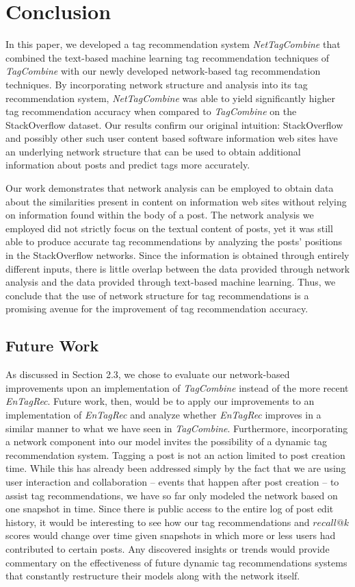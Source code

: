 \documentclass[10pt]{IEEEtran}
\begin{document}
\section{Conclusion}

In this paper, we developed a tag recommendation system \textit{NetTagCombine} that combined the text-based machine learning tag recommendation techniques of \textit{TagCombine} with our newly developed network-based tag recommendation techniques. By incorporating network structure and analysis into its tag recommendation system, \textit{NetTagCombine} was able to yield significantly higher tag recommendation accuracy when compared to \textit{TagCombine} on the StackOverflow dataset. Our results confirm our original intuition: StackOverflow and possibly other such user content based software information web sites have an underlying network structure that can be used to obtain additional information about posts and predict tags more accurately.

Our work demonstrates that network analysis can be employed to obtain data about the similarities present in content on information web sites without relying on information found within the body of a post. The network analysis we employed did not strictly focus on the textual content of posts, yet it was still able to produce accurate tag recommendations by analyzing the posts' positions in the StackOverflow networks. Since the information is obtained through entirely different inputs, there is little overlap between the data provided through network analysis and the data provided through text-based machine learning. Thus, we conclude that the use of network structure for tag recommendations is a promising avenue for the improvement of tag recommendation accuracy.

\subsection{Future Work}

As discussed in Section 2.3, we chose to evaluate our network-based improvements upon an implementation of \textit{TagCombine} instead of the more recent \textit{EnTagRec}. Future work, then, would be to apply our improvements to an implementation of \textit{EnTagRec} and analyze whether \textit{EnTagRec} improves in a similar manner to what we have seen in \textit{TagCombine}. Furthermore, incorporating a network component into our model invites the possibility of a dynamic tag recommendation system. Tagging a post is not an action limited to post creation time. While this has already been addressed simply by the fact that we are using user interaction and collaboration -- events that happen after post creation -- to assist tag recommendations, we have so far only modeled the network based on one snapshot in time. Since there is public access to the entire log of post edit history, it would be interesting to see how our tag recommendations and $recall@k$ scores would change over time given snapshots in which more or less users had contributed to certain posts. Any discovered insights or trends would provide commentary on the effectiveness of future dynamic tag recommendations systems that constantly restructure their models along with the network itself.
\end{document}
